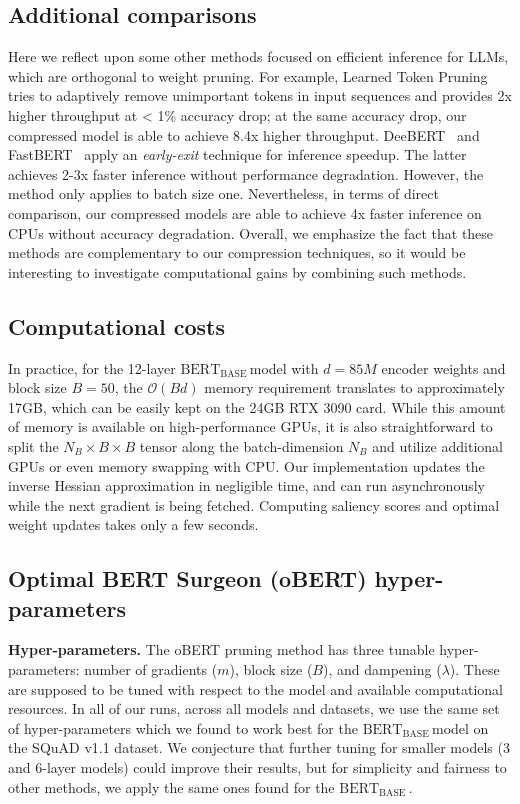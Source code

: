 \documentclass[11pt]{article}
\newcommand{\bert}{$\textrm{BERT}_{\textrm{BASE}}\,$}
\begin{document}
\subsection{Additional comparisons}
\label{app:additional_comparisons}
Here we reflect upon some other methods focused on efficient inference for LLMs, which are orthogonal to weight pruning. For example, Learned Token Pruning~\cite{kim2021learned} tries to adaptively remove unimportant tokens in input sequences and provides 2x higher throughput at < 1\% accuracy drop; at the same accuracy drop, our compressed model is able to achieve 8.4x higher throughput. DeeBERT~\cite{Xin2020DeeBERTDE} and FastBERT~\cite{liu2020fastbert} apply an \emph{early-exit} technique for inference speedup. The latter achieves 2-3x faster inference without performance degradation. However, the method only applies to batch size one. Nevertheless, in terms of direct comparison, our compressed models are able to achieve 4x faster inference on CPUs without accuracy degradation. 
Overall, we emphasize the fact that these methods are complementary to our compression techniques, so it would be interesting to investigate computational gains by combining such methods.

\subsection{Computational costs}
\label{app:computational_costs}
In practice, for the 12-layer \bert model with $d=85M$ encoder weights and block size $B=50$, the $\mathcal{O}(Bd)$ memory requirement translates to approximately 17GB, which can be easily kept on the 24GB RTX 3090 card. While this amount of memory is available on high-performance GPUs, it is also straightforward to split the $N_B \times B \times B$ tensor along the batch-dimension $N_B$ and utilize additional GPUs or even memory swapping with CPU. Our implementation updates the inverse Hessian approximation in negligible time, and can run asynchronously while the next gradient is being fetched. Computing saliency scores and optimal weight updates takes only a few seconds.

\subsection{Optimal BERT Surgeon (oBERT) hyper-parameters}
\label{app:obs-hyperparams}
\noindent\textbf{Hyper-parameters.} The oBERT pruning method has three tunable hyper-parameters: number of gradients ($m$), block size ($B$), and dampening ($\lambda$). These are supposed to be tuned with respect to the model and available computational resources. In all of our runs, across all models and datasets, we use the same set of hyper-parameters which we found to work best for the \bert model on the SQuAD v1.1 dataset. We conjecture that further tuning for smaller models (3 and 6-layer models) could improve their results, but for simplicity and fairness to other methods, we apply the same ones found for the \bert.
\end{document}
